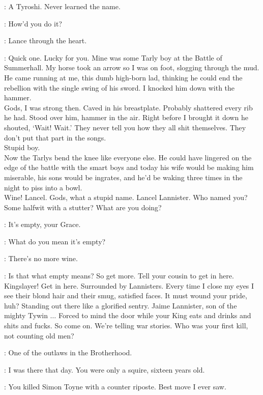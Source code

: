 \SELMY: A Tyroshi. Never learned the name. 

\ROBERT: How'd you do it? 

\SELMY: Lance through the heart. 

\ROBERT: Quick one. Lucky for you. Mine was some Tarly boy at the Battle of Summerhall. My horse took an arrow so I was on foot, slogging through the mud. He came running at me, this dumb high-born lad, thinking he could end the rebellion with the single swing of his sword. I knocked him down with the hammer.\\
Gods, I was strong then. Caved in his breastplate. Probably shattered every rib he had. Stood over him, hammer in the air. Right before I brought it down he shouted, `Wait! Wait.' They never tell you how they all shit themselves. They don't put that part in the songs.\\
Stupid boy.\\
Now the Tarlys bend the knee like everyone else. He could have lingered on the edge of the battle with the smart boys and today his wife would be making him miserable, his sons would be ingrates, and he'd be waking three times in the night to piss into a bowl.\\
Wine!  Lancel. Gods, what a stupid name. Lancel Lannister. Who named you? Some halfwit with a stutter? What are you doing? 

\LANCEL: It's empty, your Grace. 

\ROBERT: What do you mean it's empty? 

\LANCEL: There's no more wine. 

\ROBERT: Is that what empty means? So get more.  Tell your cousin to get in here. Kingslayer! Get in here.  Surrounded by Lannisters. Every time I close my eyes I see their blond hair and their smug, satisfied faces. It must wound your pride, huh? Standing out there like a glorified sentry. Jaime Lannister, son of the mighty Tywin $\ldots$ Forced to mind the door while your King eats and drinks and shits and fucks. So come on. We're telling war stories. Who was your first kill, not counting old men? 

\JAIME: One of the outlaws in the Brotherhood. 

\SELMY: I was there that day. You were only a squire, sixteen years old. 

\JAIME: You killed Simon Toyne with a counter riposte. Best move I ever saw. 

